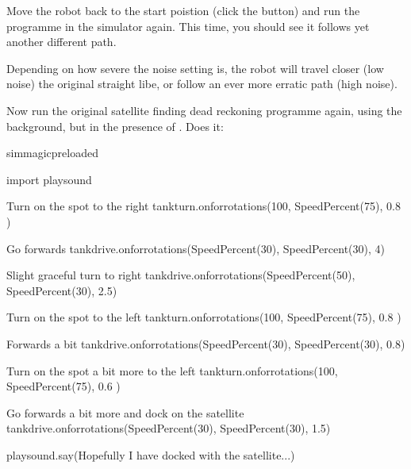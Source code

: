 \documentclass[letterpaper,10pt,english]{sphinxmanual}
\begin{document}
{Move the robot back to the start poistion (click the  button) and run the programme in the simulator again. This time, you should see it follows yet another different path.

Depending on how severe the noise setting is, the robot will travel closer (low noise) the original straight libe, or follow an ever more erratic path (high noise).

Now run the original satellite finding dead reckoning programme again, using the  background, but in the presence of . Does it:

{
\begin{sphinxVerbatim}[commandchars=\\\{\}]
\llap{\color{nbsphinxin}[ ]:\,\hspace{\fboxrule}\hspace{\fboxsep}}\PYGZpc{}\PYGZpc{}sim\PYGZus{}magic\PYGZus{}preloaded

import playsound

\PYGZsh{} Turn on the spot to the right
tank\PYGZus{}turn.on\PYGZus{}for\PYGZus{}rotations(100, SpeedPercent(75), 0.8 )

\PYGZsh{} Go forwards
tank\PYGZus{}drive.on\PYGZus{}for\PYGZus{}rotations(SpeedPercent(30), SpeedPercent(30), 4)

\PYGZsh{} Slight graceful turn to right
tank\PYGZus{}drive.on\PYGZus{}for\PYGZus{}rotations(SpeedPercent(50), SpeedPercent(30), 2.5)

\PYGZsh{} Turn on the spot to the left
tank\PYGZus{}turn.on\PYGZus{}for\PYGZus{}rotations(\PYGZhy{}100, SpeedPercent(75), 0.8 )

\PYGZsh{} Forwards a bit
tank\PYGZus{}drive.on\PYGZus{}for\PYGZus{}rotations(SpeedPercent(30), SpeedPercent(30), 0.8)

\PYGZsh{}Turn on the spot a bit more to the left
tank\PYGZus{}turn.on\PYGZus{}for\PYGZus{}rotations(\PYGZhy{}100, SpeedPercent(75), 0.6 )

\PYGZsh{} Go forwards a bit more and dock on the satellite
tank\PYGZus{}drive.on\PYGZus{}for\PYGZus{}rotations(SpeedPercent(30), SpeedPercent(30), 1.5)

playsound.say(\PYGZdq{}Hopefully I have docked with the satellite...\PYGZdq{})
\end{sphinxVerbatim}
}


}
\end{document}
